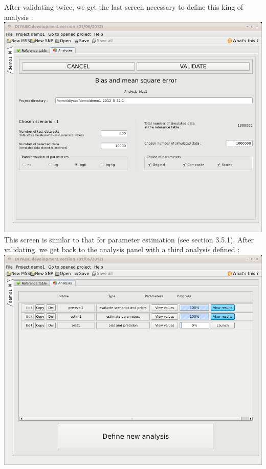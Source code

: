 After validating twice, we get the last screen necessary to define this king of analysis :\\

\includegraphics[scale=0.35]{gui_pictures/Capture-DIYABC-49.png} \\
 
This screen is similar to that for parameter estimation (see section 3.5.1). After validating, we get back to the analysis panel with a third analysis defined :\\

\includegraphics[scale=0.35]{gui_pictures/Capture-DIYABC-50.png} \\

